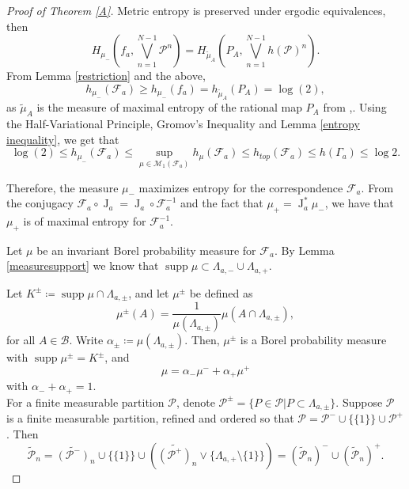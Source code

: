 \documentclass[11pt,letterpaper]{article}
\theoremstyle{definition}
\def\supp{\operatorname{supp}}
\def\F{\mathcal{F}_a}
\def\J{\operatorname{J}_a}
\def\f{f_a}
\begin{document}
\begin{proof}[Proof of Theorem \ref{A}]
Metric entropy is preserved under ergodic equivalences, then 
$$H_{\mu_-}\left(\f,\bigvee\limits_{n=1}^{N-1}\mathcal{P}^n\right)=H_{\tilde{\mu}_A}\left(P_A,\bigvee\limits_{n=1}^{N-1}h(\mathcal{P})^n\right).$$
From Lemma \ref{restriction} and the above,
$$h_{\mu_-}(\F)\geq h_{\mu_-}(\f)=h_{\tilde{\mu}_A}(P_A)=\log(2),$$
as $\tilde{\mu}_A$ is the measure of maximal entropy of the rational map $P_A$ from \cite{FreLopMan83},\cite{Lju83}.
Using the Half-Variational Principle, Gromov's Inequality and Lemma \ref{entropy inequality}, we get that
$$\log(2)\leq h_{\mu_-}(\F)\leq\sup\limits_{\mu\in\mathcal{M}_1(\F)}h_{\mu}(\F)\leq h_{top}(\F)\leq h(\Gamma_a)\leq\log2.$$

Therefore, the measure $\mu_-$ maximizes entropy for the correspondence $\F$. From the conjugacy $\F\circ\J=\J\circ\F^{-1}$ and the fact that $\mu_+=\J^*\mu_-$, we have that $\mu_+$ is of maximal entropy for $\F^{-1}$.

Let $\mu$ be an invariant Borel probability measure for $\F$. By Lemma \ref{measuresupport} we know that $\supp\mu\subset\Lambda_{a,-}\cup\Lambda_{a,+}$.

Let $K^{\pm}\coloneqq \supp\mu\cap\Lambda_{a,\pm}$, and let $\mu^{\pm}$ be defined as 
$$\mu^{\pm}(A)=\frac{1}{\mu(\Lambda_{a,\pm})}\mu(A\cap\Lambda_{a,\pm}),$$
for all $A\in\mathcal{B}$. Write $\alpha_{\pm}\coloneqq \mu(\Lambda_{a,\pm})$. Then, $\mu^{\pm}$ is a Borel probability measure with $\supp\mu^{\pm}=K^{\pm}$, and 
$$\mu=\alpha_-\mu^-+\alpha_+\mu^+$$
with $\alpha_-+\alpha_+=1$.
\\

For a finite measurable partition $\mathcal{P}$, denote $\mathcal{P}^{\pm}=\lbrace P\in\mathcal{P}|P\subset\Lambda_{a,\pm}\rbrace$. Suppose $\mathcal{P}$ is a finite measurable partition, refined and ordered so that $\mathcal{P}=\mathcal{P}^-\cup\lbrace\lbrace 1\rbrace\rbrace\cup\mathcal{P}^+$. Then
$$\widetilde{\mathcal{P}}_n=\widetilde{(\mathcal{P}^-)}_n\cup\lbrace\lbrace 1\rbrace\rbrace\cup\left(\widetilde{(\mathcal{P}^+)}_n\vee\lbrace\Lambda_{a,+}\setminus\lbrace 1\rbrace\rbrace\right)=(\widetilde{\mathcal{P}}_n)^-\cup(\widetilde{\mathcal{P}}_n)^+.$$


\end{proof}
\end{document}
